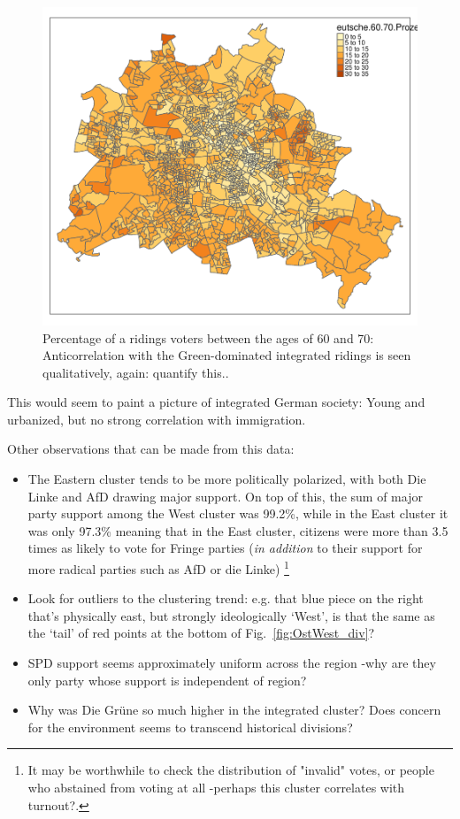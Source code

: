 \documentclass[amsmath,amssymb,nofootinbib,12pt,preprint]{revtex4}
\begin{document}
\begin{figure}[h]%
\includegraphics[scale=.65]{../figures/map_60-70}%
\caption{ Percentage of a ridings voters between the ages of 60 and 70: Anticorrelation with the Green-dominated integrated ridings is seen qualitatively, {\color{red} again: quantify this.}.}
\label{fig:map_60-70}%
\end{figure}

This would seem to paint a picture of integrated German society: Young and urbanized, but no strong correlation with immigration.

\clearpage

Other observations that can be made from this data: 
\begin{itemize}
\item The Eastern cluster tends to be more politically polarized, with both Die Linke and AfD drawing major support. On top of this, the sum of major party support among the West cluster was 99.2\%, while in the East cluster it was only 97.3\% meaning that in the East cluster, citizens were more than 3.5 times as likely to vote for Fringe parties (\emph{in addition} to their support for more radical parties such as AfD or die Linke) \footnote{It may be worthwhile to check the distribution of "invalid" votes, or people who abstained from voting at all \--perhaps this cluster correlates with turnout?.}
\item Look for outliers to the clustering trend:  e.g. that blue piece on the right that's physically east, but strongly ideologically `West', is that the same as the `tail' of red points at the bottom of Fig.~\ref{fig:OstWest_div}?
\item SPD support seems approximately uniform across the region \--why are they only party whose support is independent of region?

\item Why was Die Gr\"une so much higher in the integrated cluster?  Does concern for the environment seems to transcend historical divisions?
\end{itemize}
\end{document}
